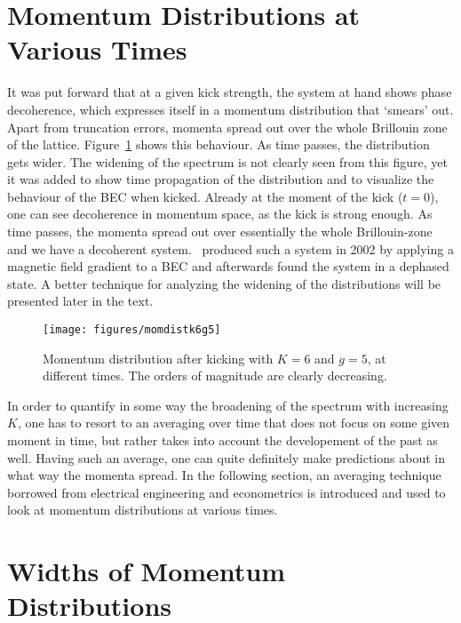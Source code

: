 \section{Momentum Distributions at Various Times}
It was put forward that at a given kick strength, the system at hand shows phase decoherence, which expresses itself in a momentum distribution that `smears' out. Apart from truncation errors, momenta spread out over the whole Brillouin zone of the lattice. Figure~\ref{fig:momdistk6g5} shows this behaviour. As time passes, the distribution gets wider. The widening of the spectrum is not clearly seen from this figure, yet it was added to show time propagation of the distribution and to visualize the behaviour of the BEC when kicked. Already at the moment of the kick ($t=0$), one can see decoherence in momentum space, as the kick is strong enough. As time passes, the momenta spread out over essentially the whole Brillouin-zone and we have a decoherent system.~\cite{esslinger} produced such a system in 2002 by applying a magnetic field gradient to a BEC and afterwards found the system in a dephased state. A better technique for analyzing the widening of the distributions will be presented later in the text. 

\begin{figure}[H]
\begin{center}
\texttt{[image: figures/momdistk6g5]}
\caption{Momentum distribution after kicking with $K=6$ and $g=5$, at different times. The orders of magnitude are clearly decreasing.}
\label{fig:momdistk6g5}
\end{center}
\end{figure}

In order to quantify in some way the broadening of the spectrum with increasing $K$, one has to resort to an averaging
over time that does not focus on some given moment in time, but rather takes into account the developement of the past as well.
Having such an average, one can quite definitely make predictions about in what way the momenta spread. In the following
section, an averaging technique borrowed from electrical engineering and econometrics is introduced and used to look at momentum distributions at various times.

\section{Widths of Momentum Distributions}
